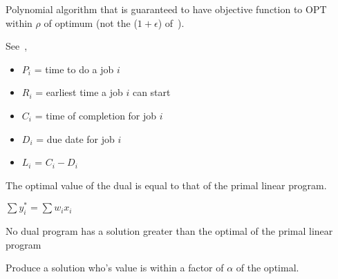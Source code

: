 \begin{definition}
    Polynomial algorithm that is guaranteed to have objective function
    to OPT within $\rho$ of
    optimum (not the ($1 + \epsilon$) of~).
\end{definition}

\begin{definition}[Scheduling]
    See~,
    \begin{itemize}
        \item \textbf{$P_{i}$} = time to do a job $i$
        \item \textbf{$R_{i}$} = earliest time a job $i$ can start
        \item \textbf{$C_{i}$} = time of completion for job $i$
        \item \textbf{$D_{i}$} = due date for job $i$
        \item \textbf{$L_{i}$} = $C_{i} - D_{i}$
    \end{itemize}
\end{definition}

\begin{definition}
    The optimal value of the dual is equal to that of the primal linear program.

    $ \sum{y^{*}_{i}} = \sum{w_{i}x_{i}}$
\end{definition}

\begin{definition}
    No dual program has a solution greater than the optimal of the primal
    linear program
\end{definition}

\begin{definition}
    Produce a solution who's value is within a factor of $\alpha$ 
    of the optimal.
\end{definition}
